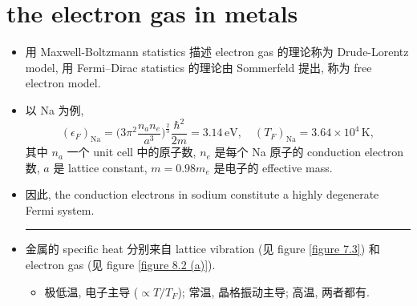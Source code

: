 \section{the electron gas in metals} \label{8.3}
\begin{itemize}
	\item 用 Maxwell-Boltzmann statistics 描述 electron gas 的理论称为 Drude-Lorentz model, 用 Fermi--Dirac statistics 的理论由 Sommerfeld 提出, 称为 free electron model.
	
	\item 以 Na 为例,
	\begin{equation}
		(\epsilon_F)_\text{Na} = \Big( 3 \pi^2 \frac{n_a n_e}{a^3} \Big)^{\frac{2}{3}} \frac{\hbar^2}{2 m} = 3.14 \, \text{eV}, \quad (T_F)_\text{Na} = 3.64 \times 10^4 \, \text{K},
	\end{equation}
	其中 $n_a$ 一个 unit cell 中的原子数, $n_e$ 是每个 Na 原子的 conduction electron 数, $a$ 是 lattice constant, $m = 0.98 m_e$ 是电子的 effective mass.
	
	\item 因此, the conduction electrons in sodium constitute a highly degenerate Fermi system.
	
	\noindent\rule[0.5ex]{\linewidth}{0.5pt} %
	
	\item 金属的 specific heat 分别来自 lattice vibration (见 figure \ref{figure 7.3}) 和 electron gas (见 figure \ref{figure 8.2 (a)}).
	\begin{itemize}
		\item 极低温, 电子主导 ($\propto T / T_F$); 常温, 晶格振动主导; 高温, 两者都有.
	\end{itemize}
\end{itemize}

